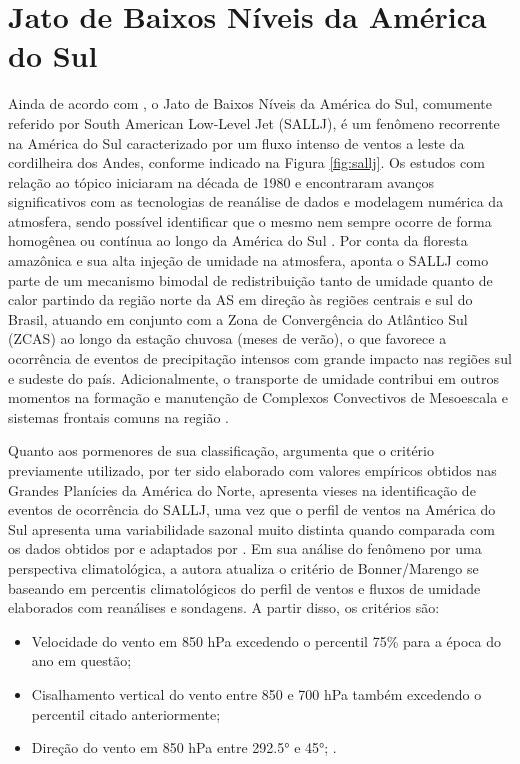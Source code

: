 \section{Jato de Baixos Níveis da América do Sul}
	Ainda de acordo com \autocite{marengo2009}, o Jato de Baixos Níveis da América do Sul, comumente referido por South American Low-Level Jet (SALLJ), é um fenômeno recorrente na América do Sul caracterizado por um fluxo intenso de ventos a leste da cordilheira dos Andes, conforme indicado na Figura \ref{fig:sallj}.  Os estudos com relação ao tópico iniciaram na década de 1980 e encontraram avanços significativos com as tecnologias de reanálise de dados e modelagem numérica da atmosfera, sendo possível identificar que o mesmo nem sempre ocorre de forma homogênea ou contínua ao longo da América do Sul \autocite{jones2019}.  Por conta da floresta amazônica e sua alta injeção de umidade na atmosfera, \autocite{herdies2002} aponta o SALLJ como parte de um mecanismo bimodal de redistribuição tanto de umidade quanto de calor partindo da região norte da AS em direção às regiões centrais e sul do Brasil, atuando em conjunto com a Zona de Convergência do Atlântico Sul (ZCAS) ao longo da estação chuvosa (meses de verão), o que favorece a ocorrência de eventos de precipitação intensos com grande impacto nas regiões sul e sudeste do país. Adicionalmente, o transporte de umidade contribui em outros momentos na formação e manutenção de Complexos Convectivos de Mesoescala e sistemas frontais comuns na região \autocite{reboita2015}. 
	
	Quanto aos pormenores de sua classificação, \autocite{montini2019} argumenta que o critério previamente utilizado, por ter sido elaborado com valores empíricos obtidos nas Grandes Planícies da América do Norte, apresenta vieses na identificação de eventos de ocorrência do SALLJ, uma vez que o perfil de ventos na América do Sul apresenta uma variabilidade sazonal muito distinta quando comparada com os dados obtidos por \autocite{bonner1968} e adaptados por \autocite{marengo2009}. Em sua análise do fenômeno por uma perspectiva climatológica, a autora atualiza o critério de Bonner/Marengo se baseando em  percentis climatológicos do perfil de ventos e fluxos de umidade elaborados com reanálises e sondagens. A partir disso, os critérios são:
	
	\begin{itemize}
		\item Velocidade do vento em 850 hPa excedendo o percentil 75\% para a época do ano em questão;
		\item Cisalhamento vertical do vento entre 850 e 700 hPa também excedendo o percentil citado anteriormente;
		\item Direção do vento em 850 hPa entre 292.5° e 45°; \autocite{montini2019}.
	\end{itemize}
	
